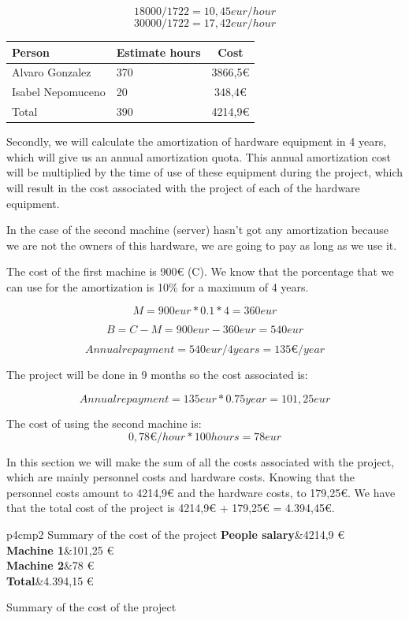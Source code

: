 \[ 18000 / 1722 = 10,45 eur/hour \]
\[ 30000 / 1722 = 17,42 eur/hour \]


\begin{table}[H]
	\centering    
    \begin{tabular}{|l|l|c|}
    \hline
    Person            & Estimate hours & Cost    \\ \hline
    Alvaro Gonzalez   & 370            & 3866,5€ \\ \hline
    Isabel Nepomuceno & 20             & 348,4€  \\ \hline
    Total             & 390            & 4214,9€  \\ \hline
    \end{tabular}
\end{table}

Secondly, we will calculate the amortization of hardware equipment in 4 years, which will give us an annual amortization quota. This annual amortization cost will be multiplied by the time of use of these equipment during the project, which will result in the cost associated with the project of each of the hardware equipment.

In the case of the second machine (server) hasn't got any amortization because we are not the owners of this hardware, we are going to pay as long as we use it.

The cost of the first machine is 900€ (C). We know that the porcentage that we can use for the amortization is 10\% for a maximum of 4 years.

\[ M = 900 eur * 0.1 * 4 = 360 eur \]

\[ B = C - M = 900 eur - 360 eur = 540 eur\]

\[Annual repayment = 540 eur / 4 years = 135€/year\]

The project will be done in 9 months so the cost associated is:

\[Annual repayment = 135 eur * 0.75 year = 101,25 eur\]

The cost of using the second machine is:
\[0,78€/hour * 100 hours = 78 eur\]

\newpage
In this section we will make the sum of all the costs associated with the project, which are mainly personnel costs and hardware costs. Knowing that the personnel costs amount to 4214,9€ and the hardware costs, to 179,25€. We have that the total cost of the project is 4214,9€ + 179,25€ = 4.394,45€. 
\FloatBarrier
\begin{table}[htb]
	\centering
	\begin{coolTable}{p{4cm}p{\textwidth-4.5cm}}{2}
{Summary of the cost of the project}
	\textbf{People salary}&4214,9 €\\		
	\textbf{Machine 1}&101,25 €\\
	\textbf{Machine 2}&78 €\\
	\textbf{Total}&4.394,15 €\\
	\end{coolTable}
	\caption{Summary of the cost of the project}
\end{table}
\FloatBarrier


